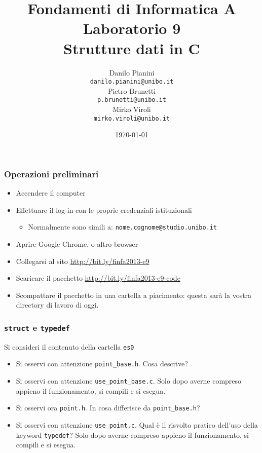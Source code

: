 \documentclass{beamer}
\begin{document}
\title[Lab1 - FV]{Fondamenti di Informatica A \\ Laboratorio 9 \\ Strutture dati in C}
\author[Danilo Pianini]{Danilo Pianini\\\texttt{danilo.pianini@unibo.it} \\ \vspace{3pt} Pietro Brunetti\\\texttt{p.brunetti@unibo.it} \\ \vspace{3pt} Mirko Viroli\\\texttt{mirko.viroli@unibo.it} }
\date[\today]{\today}

\frame{\titlepage} 

\begin{frame}[fragile]
\frametitle{Operazioni preliminari}
\begin{itemize}
 \item Accendere il computer
 \item Effettuare il log-in con le proprie credenziali istituzionali
  \begin{itemize}
    \item Normalmente sono simili a: \texttt{nome.cognome@studio.unibo.it}
  \end{itemize}
 \item Aprire Google Chrome, o altro browser
 \item Collegarsi al sito \url{http://bit.ly/finfa2013-e9}
 \item Scaricare il pacchetto \url{http://bit.ly/finfa2013-e9-code}
 \item Scompattare il pacchetto in una cartella a piacimento: questa sarà la vostra directory di lavoro di oggi.
\end{itemize}
\end{frame}

\begin{frame}[fragile]
\frametitle{\texttt{struct} e \texttt{typedef}}
Si consideri il contenuto della cartella \texttt{es0}
\begin{itemize}
 \item Si osservi con attenzione \texttt{point\_base.h}. Cosa descrive?
 \item Si osservi con attenzione \texttt{use\_point\_base.c}. Solo dopo averne compreso appieno il funzionamento, si compili e si esegua.
 \item Si osservi ora \texttt{point.h}. In cosa differisce da \texttt{point\_base.h}?
 \item Si osservi con attenzione \texttt{use\_point.c}. Qual è il risvolto pratico dell'uso della keyword \texttt{typedef}? Solo dopo averne compreso appieno il funzionamento, si compili e si esegua.
\end{itemize}
\end{frame}
\end{document}
